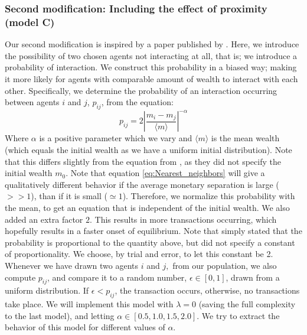 \documentclass[a4paper, 10pt]{article}
\begin{document}
\subsubsection{Second modification: Including the effect of proximity (model C)}\label{Model_C}
Our second modification is inspired by a paper published by \cite{AgentBased}. Here, we introduce the possibility of two chosen agents not interacting at all, that is; we introduce a probability of interaction. We construct this probability in a biased way; making it more likely for agents with comparable amount of wealth to interact with each other. Specifically, we determine the probability of an interaction occurring between agents $i$ and $j$, $p_{ij}$, from the equation:
\begin{equation}\label{eq:Nearest_neighbors}
p_{ij}=2\left|\frac{m_i-m_j}{\langle m \rangle} \right|^{-\alpha} 
\end{equation}
Where $\alpha$ is a positive parameter which we vary and $\langle m \rangle$ is the mean wealth (which equals the initial wealth as we have a uniform initial distribution). Note that this differs slightly from the equation from \cite{AgentBased}, as they did not specify the initial wealth $m_0$. Note that equation \ref{eq:Nearest_neighbors} will give a qualitatively different behavior if the average monetary separation is large ($>>1$), than if it is small ($\simeq 1$). Therefore, we normalize this probability with the mean, to get an equation that is independent of the initial wealth. We also added an extra factor $2$. This results in more transactions occurring, which hopefully results in a faster onset of equilibrium. Note that \cite{AgentBased} simply stated that the probability is proportional to the quantity above, but did not specify a constant of proportionality. We choose, by trial and error, to let this constant be 2.\\
\linebreak
Whenever we have drawn two agents $i$ and $j,$ from our population, we also compute $p_{ij}$, and compare it to a random number, $\epsilon \in [0,1]$, drawn from a uniform distribution. If $\epsilon < p_{ij}$, the transaction occurs, otherwise, no transactions take place. We will implement this model with $\lambda=0$ (saving the full complexity to the last model), and letting $\alpha \in [0.5, 1.0, 1.5, 2.0]$. We try to extract the behavior of this model for different values of $\alpha$. 
\end{document}
